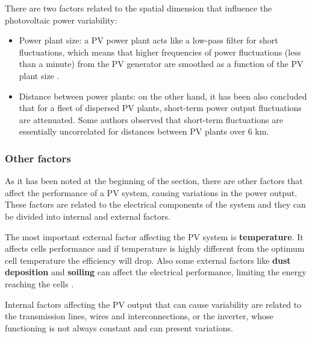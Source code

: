 There are two factors related to the spatial dimension that influence the photovoltaic power variability:

\begin{itemize}
\item Power plant size:
  a PV power plant acts like a low-pass filter for short fluctuations, which means that higher frequencies of power fluctuations (less than a minute) from the PV generator are smoothed as a function of the PV plant size \cite*{Perpinan2011, Perpinan.Marcos.ea2013}.
\item Distance between power plants:
  on the other hand, it has been also concluded that for a fleet of dispersed PV plants, short-term power output fluctuations are attenuated. Some authors observed that short-term fluctuations are essentially uncorrelated for distances between PV plants over 6 km.\cite*{Otani1997, Wiemken2001, Hoff2012}
\end{itemize}


\subsubsection{Other factors}

As it has been noted at the beginning of the section, there are other factors that affect the performance of a PV system, causing variations in the power output. These factors are related to the electrical components of the system and they can be divided into internal and external factors.

The most important external factor affecting the PV system is \textbf{temperature}. It affects cells performance and if temperature is highly different from the optimum cell temperature the efficiency will drop. Also some external factors like \textbf{dust deposition} and \textbf{soiling} can affect the electrical performance, limiting the energy reaching the cells \cite*{Fan1986, Mekhilef2012,Dubey2013}.

Internal factors affecting the PV output that can cause variability are related to the transmission lines, wires and interconnections, or the inverter, whose functioning is not always constant and can present variations.

